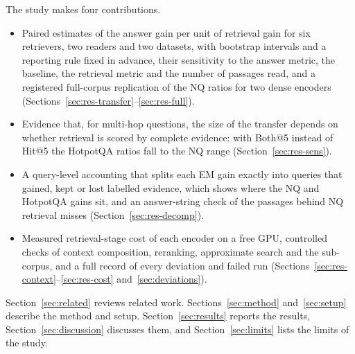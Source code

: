 The study makes four contributions.
\begin{itemize}
\item Paired estimates of the answer gain per unit of retrieval gain for six retrievers, two readers and two datasets, with bootstrap intervals and a reporting rule fixed in advance, their sensitivity to the answer metric, the baseline, the retrieval metric and the number of passages read, and a registered full-corpus replication of the NQ ratios for two dense encoders (Sections~\ref{sec:res-transfer}--\ref{sec:res-full}).
\item Evidence that, for multi-hop questions, the size of the transfer depends on whether retrieval is scored by complete evidence: with Both@5 instead of Hit@5 the HotpotQA ratios fall to the NQ range (Section~\ref{sec:res-sens}).
\item A query-level accounting that splits each EM gain exactly into queries that gained, kept or lost labelled evidence, which shows where the NQ and HotpotQA gains sit, and an answer-string check of the passages behind NQ retrieval misses (Section~\ref{sec:res-decomp}).
\item Measured retrieval-stage cost of each encoder on a free GPU, controlled checks of context composition, reranking, approximate search and the sub-corpus, and a full record of every deviation and failed run (Sections~\ref{sec:res-context}--\ref{sec:res-cost} and~\ref{sec:deviations}).
\end{itemize}

Section~\ref{sec:related} reviews related work. Sections~\ref{sec:method} and~\ref{sec:setup} describe the method and setup. Section~\ref{sec:results} reports the results, Section~\ref{sec:discussion} discusses them, and Section~\ref{sec:limits} lists the limits of the study.
